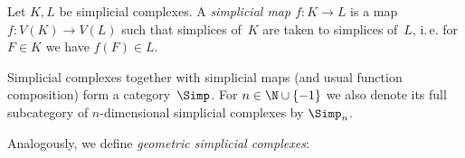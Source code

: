 \begin{thDef}
    Let $K,L$ be simplicial complexes. A \emph{simplicial map $f\colon K\to L$}
    is a map $f\colon V(K)\to V(L)$ such that simplices of~$K$ are taken to
    simplices of~$L$, i.\,e. for $F\in K$ we have $f(F) \in L$.
\end{thDef}

\begin{thDef}
    Simplicial complexes together with simplicial maps (and usual function
    composition) form a category~$\Simp$.
    For $n\in\N\cup\{-1\}$ we also denote its full subcategory of
    $n$-dimensional simplicial complexes by $\Simp_n$.
\end{thDef}

Analogously, we define \emph{geometric simplicial complexes}:

